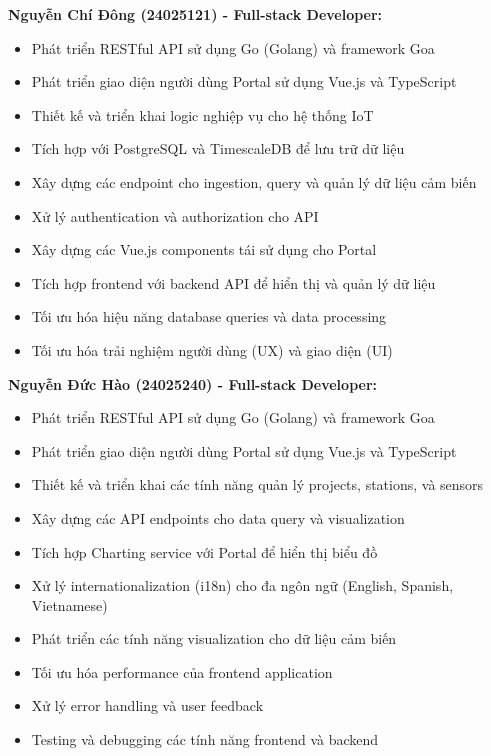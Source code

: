 \textbf{Nguyễn Chí Đông (24025121) - Full-stack Developer:}
\begin{itemize}
    \item Phát triển RESTful API sử dụng Go (Golang) và framework Goa
    \item Phát triển giao diện người dùng Portal sử dụng Vue.js và TypeScript
    \item Thiết kế và triển khai logic nghiệp vụ cho hệ thống IoT
    \item Tích hợp với PostgreSQL và TimescaleDB để lưu trữ dữ liệu
    \item Xây dựng các endpoint cho ingestion, query và quản lý dữ liệu cảm biến
    \item Xử lý authentication và authorization cho API
    \item Xây dựng các Vue.js components tái sử dụng cho Portal
    \item Tích hợp frontend với backend API để hiển thị và quản lý dữ liệu
    \item Tối ưu hóa hiệu năng database queries và data processing
    \item Tối ưu hóa trải nghiệm người dùng (UX) và giao diện (UI)
\end{itemize}

\textbf{Nguyễn Đức Hào (24025240) - Full-stack Developer:}
\begin{itemize}
    \item Phát triển RESTful API sử dụng Go (Golang) và framework Goa
    \item Phát triển giao diện người dùng Portal sử dụng Vue.js và TypeScript
    \item Thiết kế và triển khai các tính năng quản lý projects, stations, và sensors
    \item Xây dựng các API endpoints cho data query và visualization
    \item Tích hợp Charting service với Portal để hiển thị biểu đồ
    \item Xử lý internationalization (i18n) cho đa ngôn ngữ (English, Spanish, Vietnamese)
    \item Phát triển các tính năng visualization cho dữ liệu cảm biến
    \item Tối ưu hóa performance của frontend application
    \item Xử lý error handling và user feedback
    \item Testing và debugging các tính năng frontend và backend
\end{itemize}

